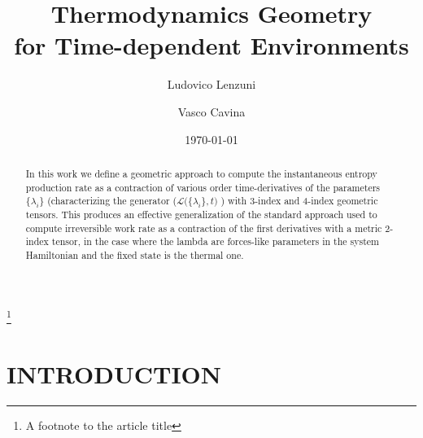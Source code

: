 \documentclass[%
 reprint,
 amsmath,amssymb,
 aps,
]{revtex4-2}
\begin{document}

\title{Thermodynamics Geometry \\ for Time-dependent Environments}%
\thanks{A footnote to the article title}%

\author{Ludovico Lenzuni}
\author{Vasco Cavina}%
%

\date{\today}%

\begin{abstract}
In this work we define a geometric approach to compute the instantaneous entropy production rate as a contraction of various order time-derivatives of the parameters $\{ \lambda_i \}$ (characterizing the generator ($\mathcal{L}\big( \{\lambda_i \}, t \big)  $ ) with 3-index and 4-index geometric tensors. This produces an effective generalization of the standard approach used to compute irreversible work rate as a contraction of the first derivatives with a metric 2-index tensor, in the case where the lambda are forces-like parameters in the system Hamiltonian and the fixed state is the thermal one. 
\end{abstract}

\maketitle


\section{INTRODUCTION}

\end{document}
